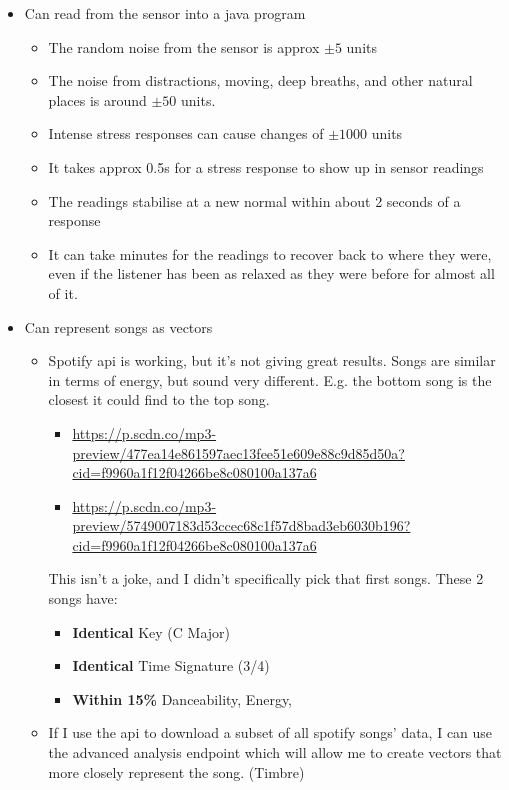 \documentclass{article}
\begin{document}
	\begin{itemize}
		\item Can read from the sensor into a java program
		\begin{itemize}
			\item The random noise from the sensor is approx $\pm5$ units
			\item The noise from distractions, moving, deep breaths, and other natural places is around $\pm50$ units.
			\item Intense stress responses can cause changes of $\pm1000$ units
			\item It takes approx 0.5s for a stress response to show up in sensor readings
			\item The readings stabilise at a new normal within about 2 seconds of a response
			\item It can take minutes for the readings to recover back to where they were, even if the listener has been as relaxed as they were before for almost all of it.
		\end{itemize}
		\item Can represent songs as vectors
		\begin{itemize}
			\item Spotify api is working, but it's not giving great results. Songs are similar in terms of energy, but sound very different. E.g. the bottom song is the closest it could find to the top song.
			
			\begin{itemize}
				\item \hyperlink{ID 3E6Ydoy1H8ePoigc10Mgsa}{https://p.scdn.co/mp3-preview/477ea14e861597aec13fee51e609e88c9d85d50a?cid=f9960a1f12f04266be8c080100a137a6}
				\item \hyperlink{ID 3KNQFdsXrTvG9CF3BioxIa}{https://p.scdn.co/mp3-preview/5749007183d53ccec68c1f57d8bad3eb6030b196?cid=f9960a1f12f04266be8c080100a137a6}
			\end{itemize}
		
			This isn't a joke, and I didn't specifically pick that first songs. These 2 songs have:
			
			\begin{itemize}
				\item \textbf{Identical} Key (C Major)
				\item \textbf{Identical} Time Signature (3/4)
				\item \textbf{Within 15\%} Danceability, Energy,
			\end{itemize}
			
			\item If I use the api to download a subset of all spotify songs' data, I can use the advanced analysis endpoint which will allow me to create vectors that more closely represent the song. (Timbre)
		\end{itemize}
	\end{itemize}
\end{document}
